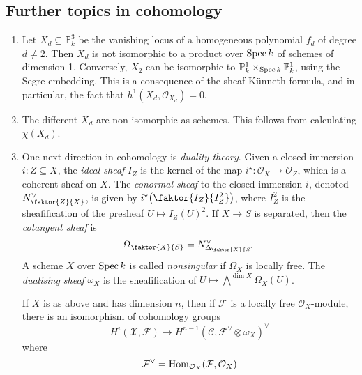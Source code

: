 \subsection{Further topics in cohomology}
\begin{enumerate}
	\item Let \( X_d \subseteq \mathbb P^3_k \) be the vanishing locus of a homogeneous polynomial \( f_d \) of degree \( d \neq 2 \).
	Then \( X_d \) is not isomorphic to a product over \( \operatorname{Spec} k \) of schemes of dimension 1.
	Conversely, \( X_2 \) can be isomorphic to \( \mathbb P^1_k \times_{\operatorname{Spec} k} \mathbb P^1_k \), using the Segre embedding.
	This is a consequence of the sheaf K\"unneth formula, and in particular, the fact that \( h^1(X_d, \mathcal O_{X_d}) = 0 \).
	\item The different \( X_d \) are non-isomorphic as schemes.
	This follows from calculating \( \chi(X_d) \).
	\item One next direction in cohomology is \emph{duality theory}.
	Given a closed immersion \( i : Z \subseteq X \), the \emph{ideal sheaf} \( I_Z \) is the kernel of the map \( i^\star : \mathcal O_X \to \mathcal O_Z \), which is a coherent sheaf on \( X \).
	The \emph{conormal sheaf} to the closed immersion \( i \), denoted \( N^\vee_{\faktor{Z}{X}} \), is given by \( i^\star \qty(\faktor{I_Z}{I_Z^2}) \), where \( I_Z^2 \) is the sheafification of the presheaf \( U \mapsto I_Z(U)^2 \).
	If \( X \to S \) is separated, then the \emph{cotangent sheaf} is
	\[ \Omega_{\faktor{X}{S}} = N^\vee_{\Delta_{\faktor{X}{S}}} \]
	A scheme \( X \) over \( \operatorname{Spec} k \) is called \emph{nonsingular} if \( \Omega_X \) is locally free.
	The \emph{dualising sheaf} \( \omega_X \) is the sheafification of \( U \mapsto \bigwedge^{\dim X} \Omega_X(U) \).
	\begin{theorem}
		If \( X \) is as above and has dimension \( n \), then if \( \mathcal F \) is a locally free \( \mathcal O_X \)-module, there is an isomorphism of cohomology groups
		\[ H^i(\mathcal X, \mathcal F) \to H^{n-1}(\mathcal C, \mathcal F^\vee \otimes \omega_X)^\vee \]
		where
		\[ \mathcal F^\vee = \operatorname{Hom}_{\mathcal O_X}(\mathcal F, \mathcal O_X) \]
	\end{theorem}
\end{enumerate}
